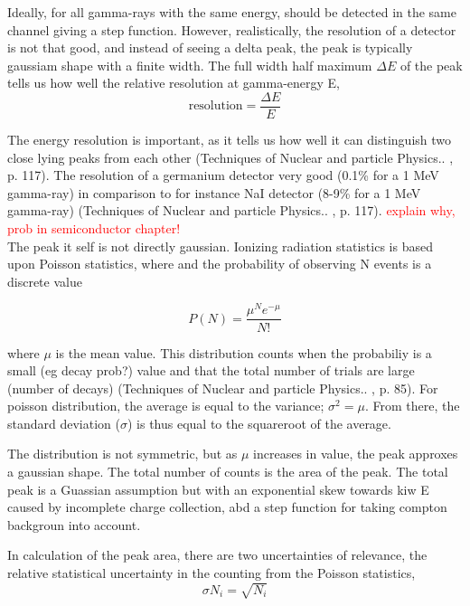 Ideally, for all gamma-rays with the same energy, should be detected in the same channel giving a step function. However, realistically, the resolution of a detector is not that good, and instead of seeing a delta peak, the peak is typically gaussiam shape with a finite width. The full width half maximum $\Delta E$ of the peak tells us how well the relative resolution at gamma-energy E,
\begin{equation}
    \text{resolution} = \frac{\Delta E}{E}
\end{equation}

The energy resolution is important, as it tells us how well it can distinguish two close lying peaks from each other (Techniques of Nuclear and particle Physics.. , p. 117).  The resolution of a germanium detector very good (0.1\% for a 1 MeV gamma-ray) in comparison to for instance NaI detector (8-9\% for a 1 MeV gamma-ray) (Techniques of Nuclear and particle Physics.. , p. 117). \textcolor{red}{explain why, prob in semiconductor chapter!} \\


The peak it self is not directly gaussian. Ionizing radiation statistics is based upon Poisson statistics, where  and the probability of observing N events is a discrete value

\begin{equation}
    P(N) = \frac{\mu^N e^{-\mu}}{N!}
\end{equation}

where $\mu$ is the mean value. This distribution counts when the probabiliy is a small (eg decay prob?) value and that the total number of trials are large (number of decays) (Techniques of Nuclear and particle Physics.. , p. 85).  For poisson distribution, the average is equal to the variance; $\sigma^2=\mu$. From there, the standard deviation ($\sigma$) is thus equal to the squareroot of the average. 

The distribution is not symmetric, but as $\mu$ increases in value, the peak approxes a gaussian shape. The total number of counts is the area of the peak. The total peak is a Guassian assumption but with an exponential skew towards kiw E caused by incomplete charge collection, abd a step function for taking compton backgroun into account. 

In calculation of the peak area, there are two uncertainties of relevance, the relative statistical uncertainty in the counting from the Poisson statistics, 
\begin{equation}
\sigma N_i = \sqrt{N_i}
\end{equation}

